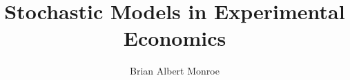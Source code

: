 \documentclass[12pt,a4paper]{report}
\title{Stochastic Models in Experimental Economics}
\author{Brian Albert Monroe}
\makeatletter
\newcommand{\lltoc}[1]{
	\pagenumbering{gobble}
	\makeatletter
	\@starttoc{toc}%
	\makeatother
	\break
	\pagenumbering{arabic}
}
\let\oldchapter\chapter
\renewcommand{\chapter}[1]{
	\refstepcounter{chapter}%
	\oldchapter*{{\huge Chapter \thechapter}\\[1em]#1}
}
\newcommand{\onlyinsubfile}[1]{#1}
\newcommand{\notinsubfile}[1]{}
\makeatother
\begin{document}
\renewcommand{\onlyinsubfile}[1]{}
\renewcommand{\notinsubfile}[1]{#1}
\renewcommand{\lltoc}[1]{}
\let\chapter\oldchapter

\maketitle
\doublespacing
\tableofcontents







\printbibliography
\end{document}
